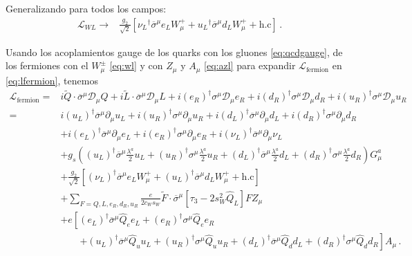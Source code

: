 \begin{frame}
Generalizando para todos los campos:
\begin{align}
  \label{eq:wl}
   \mathcal{L}_{W L}\to&\frac{g_2}{\sqrt{2}}\left[{\nu_L}^{\dagger}\overline{\sigma}^\mu e_LW_\mu^++
{u_L}^{\dagger}\overline{\sigma}^\mu d_LW_\mu^++\text{h.c}\right]\,.
\end{align}



Usando los acoplamientos gauge de los quarks con los gluones \eqref{eq:qcdgauge}, de los fermiones con el $W_\mu^\pm$  \eqref{eq:wl} y  con $Z_\mu$ y $A_\mu$ \eqref{eq:azl} para expandir $\mathcal{L}_{\text{fermion}}$ en \eqref{eq:lfermion}, tenemos
\begin{align}
\label{eq:sm1g2}
 \mathcal{L}_{\text{fermion}}=&i \widetilde{Q}\cdot \overline{\sigma}^\mu\mathcal{D}_\mu Q+i \widetilde{L}\cdot\overline{\sigma}^\mu\mathcal{D}_\mu L+
i\left(e_R \right)^{\dagger}\sigma^\mu\mathcal{D}_\mu {e_R}+i(d_R)^\dagger \sigma^\mu\mathcal{D}_\mu {d_R}+i(u_R)^\dagger \sigma^\mu\mathcal{D}_\mu {u_R}\nonumber\\
  =&i(u_L)^\dagger \overline{\sigma}^\mu\partial_\mu u_L+i(u_R)^\dagger \sigma^\mu{\partial}_\mu {u_R}+i(d_L)^\dagger \overline{\sigma}^\mu\partial_\mu d_L+i(d_R)^\dagger \sigma^\mu{\partial}_\mu {d_R}\nonumber\\
&+i(e_L)^\dagger \overline{\sigma}^\mu{\partial}_\mu e_L
+i\left(e_R \right)^{\dagger}\sigma^\mu{\partial}_\mu {e_R}+i(\nu_L)^\dagger \overline{\sigma}^\mu{\partial}_\mu \nu_L\nonumber\\
&+g_s \left((u_L)^\dagger \overline{\sigma}^\mu\frac{\lambda^a}{2}u_L+(u_R)^\dagger {\sigma}^{\mu}\frac{\lambda^a}{2}u_R
+(d_L)^\dagger \overline{\sigma}^{\mu}\frac{\lambda^a}{2}d_L+ (d_R)^\dagger \sigma^{\mu}\frac{\lambda^a}{2}d_R\right)G_{\mu}^a\nonumber\\
&+\frac{g_2}{\sqrt{2}}\left[(\nu_L)^\dagger \overline{\sigma}^\mu e_LW_\mu^++
(u_L)^\dagger \overline{\sigma}^\mu d_LW_\mu^++\text{h.c}\right]\nonumber\\
&+\sum_{F=Q,L,e_R,d_R,u_R}\frac{e}{2c_W s_W}\widetilde{F}\cdot\overline{\sigma}^\mu\left[ \tau_3-2s_W^2\widehat{Q}_L\right]F Z_\mu\nonumber\\
&+e\left[(e_L)^\dagger \overline{\sigma}^\mu \widehat{Q}_e e_L+\left(e_R \right)^{\dagger}\sigma^\mu \widehat{Q}_e e_R\right.\nonumber\\
  &\qquad\left.+(u_L)^\dagger \overline{\sigma}^\mu \widehat{Q}_u u_L+(u_R)^\dagger {\sigma}^\mu \widehat{Q}_u u_R
+(d_L)^\dagger \overline{\sigma}^\mu \widehat{Q}_d d_L+(d_R)^\dagger \sigma^\mu \widehat{Q}_d d_R\right] A_\mu\,.
\end{align}
\end{frame}


